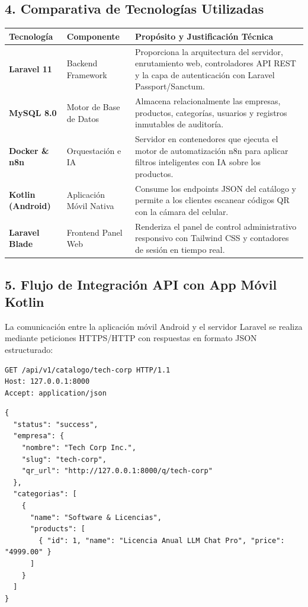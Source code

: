 \subsection{4. Comparativa de Tecnologías Utilizadas}
\begin{longtable}{p{3.5cm}p{4.5cm}p{7.5cm}}
\toprule
\textbf{Tecnología} & \textbf{Componente} & \textbf{Propósito y Justificación Técnica} \\
\midrule
\endhead
\textbf{Laravel 11} & Backend Framework & Proporciona la arquitectura del servidor, enrutamiento web, controladores API REST y la capa de autenticación con Laravel Passport/Sanctum. \\
\textbf{MySQL 8.0} & Motor de Base de Datos & Almacena relacionalmente las empresas, productos, categorías, usuarios y registros inmutables de auditoría. \\
\textbf{Docker \& n8n} & Orquestación e IA & Servidor en contenedores que ejecuta el motor de automatización n8n para aplicar filtros inteligentes con IA sobre los productos. \\
\textbf{Kotlin (Android)} & Aplicación Móvil Nativa & Consume los endpoints JSON del catálogo y permite a los clientes escanear códigos QR con la cámara del celular. \\
\textbf{Laravel Blade} & Frontend Panel Web & Renderiza el panel de control administrativo responsivo con Tailwind CSS y contadores de sesión en tiempo real. \\
\bottomrule
\end{longtable}

\subsection{5. Flujo de Integración API con App Móvil Kotlin}
La comunicación entre la aplicación móvil Android y el servidor Laravel se realiza mediante peticiones HTTPS/HTTP con respuestas en formato JSON estructurado:

\begin{lstlisting}[language=bash, caption={Peticion HTTP enviada por la App Android Kotlin al escanear el QR}]
GET /api/v1/catalogo/tech-corp HTTP/1.1
Host: 127.0.0.1:8000
Accept: application/json
\end{lstlisting}

\begin{lstlisting}[language={}, caption={Respuesta JSON recibida por la App Kotlin}]
{
  "status": "success",
  "empresa": {
    "nombre": "Tech Corp Inc.",
    "slug": "tech-corp",
    "qr_url": "http://127.0.0.1:8000/q/tech-corp"
  },
  "categorias": [
    {
      "name": "Software & Licencias",
      "products": [
        { "id": 1, "name": "Licencia Anual LLM Chat Pro", "price": "4999.00" }
      ]
    }
  ]
}
\end{lstlisting}
